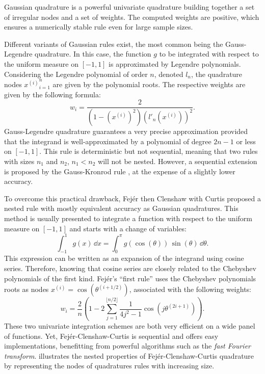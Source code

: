 Gaussian quadrature is a powerful univariate quadrature building together a set of irregular nodes and a set of weights. 
The computed weights are positive, which ensures a numerically stable rule even for large sample sizes.

Different variants of Gaussian rules exist, the most common being the Gauss-Legendre quadrature. 
In this case, the function $g$ to be integrated with respect to the uniform measure on $[-1, 1]$ is approximated by Legendre polynomials. 
Considering the Legendre polynomial of order $n$, denoted $l_n$, the quadrature nodes ${x^{(i)}}_{i=1}^n$ are given by the polynomial roots. 
The respective weights are given by the following formula: 
\begin{equation}
    w_{i}={\frac {2}{\left(1-\left(x^{(i)}\right)^{2}\right)\left(l'_{n}(x^{(i)})\right)^{2}}}.
\end{equation}
Gauss-Legendre quadrature guarantees a very precise approximation provided that the integrand is well-approximated by a polynomial of degree $2n-1$ or less on $[-1, 1]$.
This rule is deterministic but not sequential, meaning that two rules with sizes $n_1$ and $n_2$, $n_1 < n_2$ will not be nested. 
However, a sequential extension is proposed by the Gauss-Kronrod rule \citep{laurie_1997}, at the expense of a slightly lower accuracy. 

To overcome this practical drawback, Fejér then Clenshaw with Curtis proposed a nested rule with mostly equivalent accuracy as Gaussian quadratures.
This method is usually presented to integrate a function with respect to the uniform measure on $[-1, 1]$ and starts with a change of variables:
\begin{equation}
    \int_{-1}^{1} g(x) \, \dd x = \int_{0}^{\pi} g\left(\cos(\theta)\right) \, \sin(\theta) \, \dd \theta. 
\end{equation}
This expression can be written as an expansion of the integrand using cosine series. 
Therefore, knowing that cosine series are closely related to the Chebyshev polynomials of the first kind. 
Fejér's ``first rule'' \citep{trefethen_2008} uses the Chebyshev polynomials roots as nodes $x^{(i)} = \cos(\theta^{(i+1/2)})$, associated with the following weights:
\begin{equation}
    w_i=\frac{2}{n}\left(1-2\sum_{j=1}^{\lfloor n/2 \rfloor}\frac{1}{4j^2-1}\cos\left(j\theta^{(2i+1)}\right)\right).    
\end{equation}
These two univariate integration schemes are both very efficient on a wide panel of functions. 
Yet, Fejér-Clenshaw-Curtis is sequential and offers easy implementations, benefitting from powerful algorithms such as the \textit{fast Fourier transform}. 
 illustrates the nested properties of Fejér-Clenshaw-Curtis quadrature by representing the nodes of quadratures rules with increasing size.  


